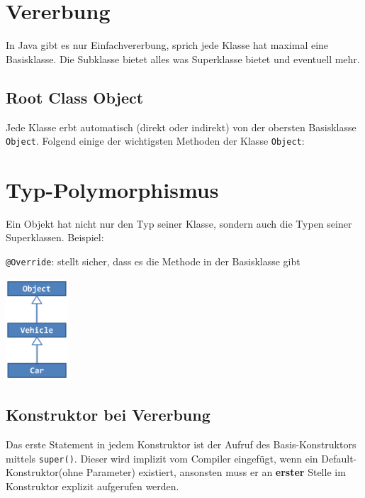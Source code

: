 \section*{Vererbung}
	In Java gibt es nur Einfachvererbung, sprich jede Klasse hat maximal eine Basisklasse. Die Subklasse bietet alles was Superklasse bietet und eventuell mehr.\\
	\begin{minipage}[t]{8cm}
		\subsection*{Root Class Object}
		Jede Klasse erbt automatisch (direkt oder indirekt) von der obersten Basisklasse \texttt{Object}. Folgend einige der wichtigsten Methoden der Klasse \texttt{Object}:
		
		\section*{Typ-Polymorphismus}
		Ein Objekt hat nicht nur den Typ seiner Klasse, sondern auch die Typen seiner Superklassen. Beispiel:
		\begin{minipage}[t]{5cm}
			
			\vspace*{0.5cm}
			\texttt{@Override}: stellt sicher, dass es die Methode in der Basisklasse gibt
		\end{minipage}
		\hspace*{0.5cm}
		\begin{minipage}[b]{2.3cm}
			\includegraphics[height=3.8cm, align=t]{pics/Typ_Polymorphismus.PNG}
		\end{minipage}
	\end{minipage}
	\hspace*{0.5cm}
	\begin{minipage}[t]{10.3cm}
		\subsection*{Konstruktor bei Vererbung}
			Das erste Statement in jedem Konstruktor ist der Aufruf des Basis-Konstruktors mittels \texttt{super()}. Dieser wird implizit vom Compiler eingefügt, wenn ein Default-Konstruktor(ohne Parameter) existiert, ansonsten muss er an \textbf{erster} Stelle im Konstruktor explizit aufgerufen werden.
			
	\end{minipage}

	
	